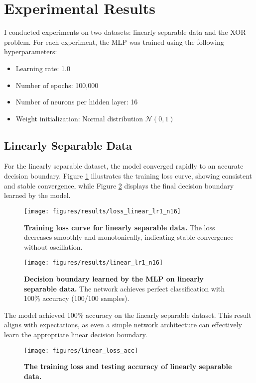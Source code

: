 \documentclass[twocolumn]{extarticle}
\begin{document}
\section{Experimental Results}
I conducted experiments on two datasets: linearly separable data and the XOR problem. For each experiment, the MLP was trained using the following hyperparameters:
\begin{itemize}
    \item Learning rate: 1.0
    \item Number of epochs: 100,000
    \item Number of neurons per hidden layer: 16
    \item Weight initialization: Normal distribution $\mathcal{N}(0, 1)$
\end{itemize}

\subsection{Linearly Separable Data}
For the linearly separable dataset, the model converged rapidly to an accurate decision boundary. Figure \ref{fig:linear_loss} illustrates the training loss curve, showing consistent and stable convergence, while Figure \ref{fig:linear_results} displays the final decision boundary learned by the model.

\begin{figure}[H]
\centering
\texttt{[image: figures/results/loss\_linear\_lr1\_n16]}
\caption{\textbf{Training loss curve for linearly separable data.} The loss decreases smoothly and monotonically, indicating stable convergence without oscillation.}
\label{fig:linear_loss}
\end{figure}

\begin{figure}[H]
\centering
\texttt{[image: figures/results/linear\_lr1\_n16]}
\caption{\textbf{Decision boundary learned by the MLP on linearly separable data.} The network achieves perfect classification with 100\% accuracy (100/100 samples).}
\label{fig:linear_results}
\end{figure}

The model achieved 100\% accuracy on the linearly separable dataset. This result aligns with expectations, as even a simple network architecture can effectively learn the appropriate linear decision boundary.

\begin{figure}[H]
\centering
\texttt{[image: figures/linear\_loss\_acc]}
\caption{\textbf{The training loss and testing accuracy of linearly separable data.}}
\label{fig:linearlossacc}
\end{figure}
\end{document}
